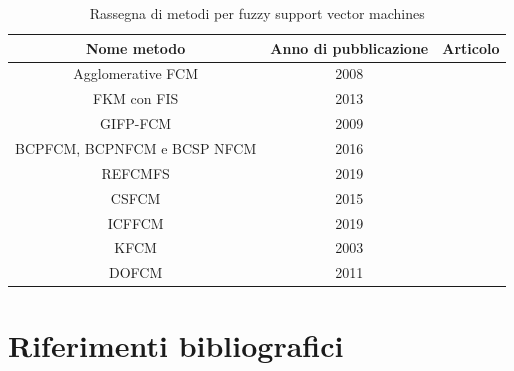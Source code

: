 \documentclass{article}
\begin{document}
	\begin{table}[h!]
		\caption{Rassegna di metodi per fuzzy support vector machines}
		\begin{center}\begin{tabular}{ |c|c|c| } 
				\hline
				Nome metodo & Anno di pubblicazione & Articolo\\
				\hline
				Agglomerative FCM & 2008 & \cite{bib:afkm}\\
				\hline
				FKM con FIS & 2013 & \cite{bib:fkmfis}\\ 
				\hline
				GIFP-FCM & 2009 & \cite{bib:gifpfcm}\\
				\hline
				BCPFCM, BCPNFCM e BCSP NFCM & 2016 & \cite{bib:bcpfcm}\\
				\hline
				REFCMFS & 2019 & \cite{bib:refcmfs}\\ 
				\hline
				CSFCM & 2015 & \cite{bib:csfcm}\\
				\hline
				ICFFCM & 2019 &\cite{bib:icffcm}\\
				\hline
				KFCM & 2003 &\cite{bib:kfcm}\\
				\hline
				DOFCM & 2011 & \cite{bib:dofcm}\\
				\hline													
			\end{tabular}
		\end{center}
	\end{table}			
			
		
	\section{Riferimenti bibliografici}


{}
\end{document}

